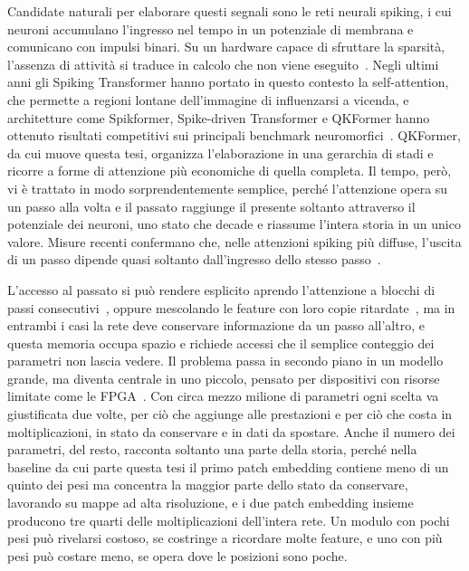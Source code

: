 Candidate naturali per elaborare questi segnali sono le reti neurali spiking, i cui neuroni accumulano l'ingresso nel tempo in un potenziale di membrana e comunicano con impulsi binari. Su un hardware capace di sfruttare la sparsità, l'assenza di attività si traduce in calcolo che non viene eseguito~\cite{li2024sparseacc,du2024spike}. Negli ultimi anni gli Spiking Transformer hanno portato in questo contesto la self-attention, che permette a regioni lontane dell'immagine di influenzarsi a vicenda, e architetture come Spikformer, Spike-driven Transformer e QKFormer hanno ottenuto risultati competitivi sui principali benchmark neuromorfici~\cite{zhou2023spikformer,yao2023spikedriven,zhou2024qkformer}. QKFormer, da cui muove questa tesi, organizza l'elaborazione in una gerarchia di stadi e ricorre a forme di attenzione più economiche di quella completa. Il tempo, però, vi è trattato in modo sorprendentemente semplice, perché l'attenzione opera su un passo alla volta e il passato raggiunge il presente soltanto attraverso il potenziale dei neuroni, uno stato che decade e riassume l'intera storia in un unico valore. Misure recenti confermano che, nelle attenzioni spiking più diffuse, l'uscita di un passo dipende quasi soltanto dall'ingresso dello stesso passo~\cite{shi2026multidelay}.

L'accesso al passato si può rendere esplicito aprendo l'attenzione a blocchi di passi consecutivi~\cite{lee2025spiking}, oppure mescolando le feature con loro copie ritardate~\cite{shi2026multidelay}, ma in entrambi i casi la rete deve conservare informazione da un passo all'altro, e questa memoria occupa spazio e richiede accessi che il semplice conteggio dei parametri non lascia vedere. Il problema passa in secondo piano in un modello grande, ma diventa centrale in uno piccolo, pensato per dispositivi con risorse limitate come le FPGA~\cite{karamimanesh2025fpga}. Con circa mezzo milione di parametri ogni scelta va giustificata due volte, per ciò che aggiunge alle prestazioni e per ciò che costa in moltiplicazioni, in stato da conservare e in dati da spostare. Anche il numero dei parametri, del resto, racconta soltanto una parte della storia, perché nella baseline da cui parte questa tesi il primo patch embedding contiene meno di un quinto dei pesi ma concentra la maggior parte dello stato da conservare, lavorando su mappe ad alta risoluzione, e i due patch embedding insieme producono tre quarti delle moltiplicazioni dell'intera rete. Un modulo con pochi pesi può rivelarsi costoso, se costringe a ricordare molte feature, e uno con più pesi può costare meno, se opera dove le posizioni sono poche.

